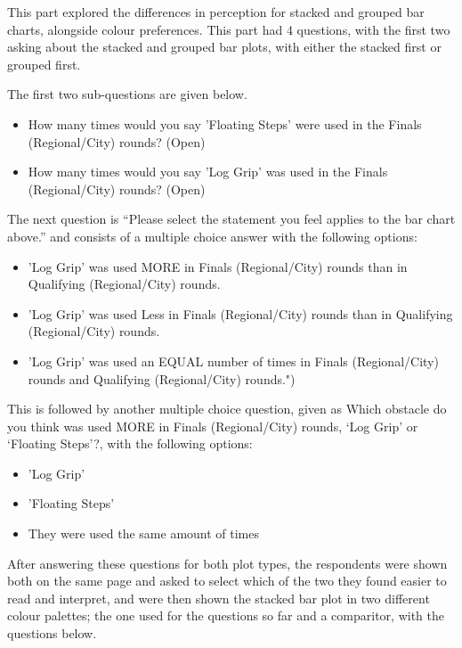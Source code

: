 \documentclass[
  11pt,
]{book}
\begin{document}
This part explored the differences in perception for stacked and grouped
bar charts, alongside colour preferences. This part had 4 questions,
with the first two asking about the stacked and grouped bar plots, with
either the stacked first or grouped first.

The first two sub-questions are given below.

\begin{itemize}
  \item How many times would you say 'Floating Steps' were used in the Finals (Regional/City) rounds? (Open)
  \item How many times would you say 'Log Grip' was used in the Finals (Regional/City) rounds? (Open)
\end{itemize}

The next question is ``Please select the statement you feel applies to
the bar chart above.'' and consists of a multiple choice answer with the
following options:

\begin{itemize}
  \item 'Log Grip' was used MORE in Finals (Regional/City) rounds than in Qualifying (Regional/City) rounds.
  \item 'Log Grip' was used Less in Finals (Regional/City) rounds than in Qualifying (Regional/City) rounds. 
  \item 'Log Grip' was used an EQUAL number of times in Finals (Regional/City) rounds and Qualifying (Regional/City) rounds.")
\end{itemize}

This is followed by another multiple choice question, given as Which
obstacle do you think was used MORE in Finals (Regional/City) rounds,
`Log Grip' or `Floating Steps'?, with the following options:

\begin{itemize}  
  \item 'Log Grip'
  \item 'Floating Steps'
  \item They were used the same amount of times
\end{itemize}

After answering these questions for both plot types, the respondents
were shown both on the same page and asked to select which of the two
they found easier to read and interpret, and were then shown the stacked
bar plot in two different colour palettes; the one used for the
questions so far and a comparitor, with the questions below.
\end{document}
